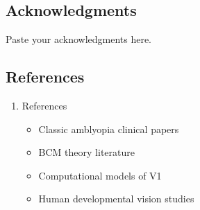 \documentclass[
]{article}
\providecommand{\tightlist}{%
  \setlength{\itemsep}{0pt}\setlength{\parskip}{0pt}}
\begin{document}
\subsection{Acknowledgments}\label{sec:acknowledgments}

Paste your acknowledgments here.

\subsection{References}\label{sec:references}

\begin{enumerate}
\def\labelenumi{\arabic{enumi}.}
\setcounter{enumi}{7}
\item
  References

  \begin{itemize}
  \tightlist
  \item[$\boxtimes$]
    Classic amblyopia clinical papers
  \item[$\boxtimes$]
    BCM theory literature
  \item[$\boxtimes$]
    Computational models of V1
  \item[$\boxtimes$]
    Human developmental vision studies
  \end{itemize}
\end{enumerate}
\end{document}
